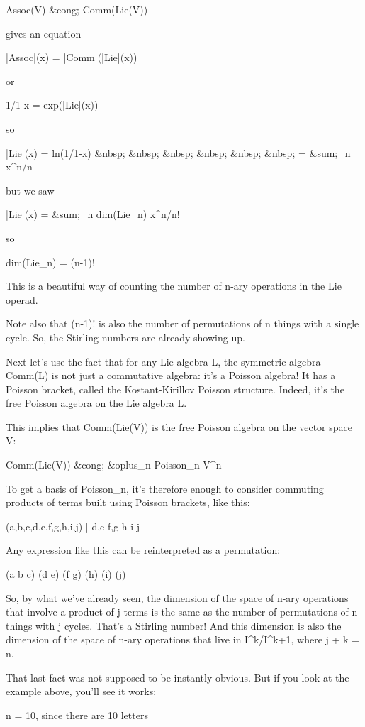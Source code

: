 Assoc(V) &cong; Comm(Lie(V))

gives an equation

|Assoc|(x) = |Comm|(|Lie|(x))

or 

1/1-x = exp(|Lie|(x))

so

|Lie|(x) = ln(1/1-x) 
&nbsp; &nbsp; &nbsp; &nbsp; &nbsp; &nbsp;
         = &sum;_{n} x^{n}/n

but we saw

|Lie|(x) = &sum;_{n} dim(Lie_{n}) x^{n}/n!

so 

dim(Lie_{n}) = (n-1)!

This is a beautiful way of counting the number of n-ary operations in 
the Lie operad.

Note also that (n-1)! is also the number of permutations of n things
with a single cycle.  So, the Stirling numbers are already showing up.

Next let's use the fact that for any Lie algebra L, the symmetric
algebra Comm(L) is not just a commutative algebra: it's a Poisson
algebra!  It has a Poisson bracket, called the Kostant-Kirillov
Poisson structure.  Indeed, it's the free Poisson algebra on the Lie
algebra L.

This implies that Comm(Lie(V)) is the free Poisson algebra on
the vector space V:

Comm(Lie(V)) &cong; &oplus_{n} Poisson_{n} \otimes 
V^{\otimes n}

To get a basis of Poisson_{n}, it's therefore enough to consider
commuting products of terms built using Poisson brackets, like this:

(a,b,c,d,e,f,g,h,i,j) | {d,e} {f,g} h i j

Any expression like this can be reinterpreted as a permutation:

(a b c) (d e) (f g) (h) (i) (j)

So, by what we've already seen, the dimension of the space of n-ary
operations that involve a product of j terms is the same as the number
of permutations of n things with j cycles.  That's a Stirling number!
And this dimension is also the dimension of the space of n-ary
operations that live in I^{k}/I^{k+1}, where j + k = n.  

That last fact was not supposed to be instantly obvious.  But if you
look at the example above, you'll see it works:

n = 10, since there are 10 letters

